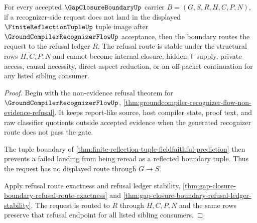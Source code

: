 \begin{theorem}
\label{thm:gap-closure-boundary-recognizer-refusal-stability}
For every accepted $\GapClosureBoundaryUp$ carrier $B=(G,S,R,H,C,P,N)$, if a recognizer-side request does not land in the displayed $\FiniteReflectionTupleUp$ tuple image after $\GroundCompilerRecognizerFlowUp$ acceptance, then the boundary routes the request to the refusal ledger $R$. The refusal route is stable under the structural rows $H,C,P,N$ and cannot become internal closure, hidden $\mathsf{T}$ supply, private access, causal necessity, direct aspect reduction, or an off-packet continuation for any listed sibling consumer.
\end{theorem}
\begin{proof}
Begin with the non-evidence refusal theorem for $\GroundCompilerRecognizerFlowUp$, \autoref{thm:groundcompiler-recognizer-flow-non-evidence-refusal}. It keeps report-like source, host compiler state, proof text, and raw classifier quotients outside accepted evidence when the generated recognizer route does not pass the gate.

The tuple boundary of \autoref{thm:finite-reflection-tuple-fieldfaithful-prediction} then prevents a failed landing from being reread as a reflected boundary tuple. Thus the request has no displayed route through $G \longrightarrow S$.

Apply refusal route exactness and refusal ledger stability, \autoref{thm:gap-closure-boundary-refusal-route-exactness} and \autoref{thm:gap-closure-boundary-refusal-ledger-stability}. The request is routed to $R$ through $H,C,P,N$ and the same rows preserve that refusal endpoint for all listed sibling consumers.
\end{proof}

